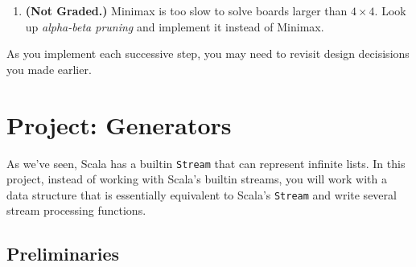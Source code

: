 \documentclass[9pt]{extbook}
\begin{document}
\begin{enumerate}
\quad
{}
\quad
{}

\item\textbf{(Not Graded.)} Minimax is too slow to solve boards larger than
$4 \times 4$. Look up \emph{alpha-beta pruning} and implement it instead
of Minimax.

\end{enumerate}

As you implement each successive step, you may need to revisit design
decisisions you made earlier.



\chapter{Project: Generators}

As we've seen, Scala has a builtin \lstinline|Stream| that can represent
infinite lists. In this project, instead of working with Scala's builtin
streams, you will work with a data structure that is essentially equivalent to
Scala's \lstinline|Stream| and write several stream processing functions.

\section{Preliminaries}
\end{document}
